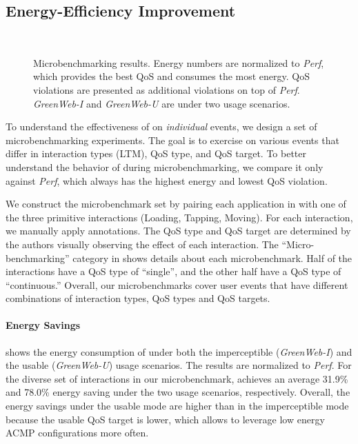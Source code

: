 \subsection{Energy-Efficiency Improvement}
\label{sec:lang:eval:effect}

\begin{figure}[p]
\centering
{}\\
\vspace*{25pt}
\caption{Microbenchmarking results. Energy numbers are normalized to \textit{Perf}, which provides the best QoS and consumes the most energy. QoS violations are presented as additional violations on top of \textit{Perf}. \textit{GreenWeb-I} and \textit{GreenWeb-U} are \greenweb under two usage scenarios.}
\label{fig:ubenchmark_results}
\end{figure}

To understand the effectiveness of \greenweb on \textit{individual} events, we design a set of microbenchmarking experiments. The goal is to exercise \greenweb on various events that differ in interaction types (LTM), QoS type, and QoS target. To better understand the behavior of \greenweb during microbenchmarking, we compare it only against \textit{Perf}, which always has the highest energy and lowest QoS violation.

We construct the microbenchmark set by pairing each application in  with one of the three primitive interactions (Loading, Tapping, Moving). For each interaction, we manually apply \greenweb annotations. The QoS type and QoS target are determined by the authors visually observing the effect of each interaction. The ``Micro-benchmarking'' category in  shows details about each microbenchmark. Half of the interactions have a QoS type of ``single'', and the other half have a QoS type of ``continuous.'' Overall, our microbenchmarks cover user events that have different combinations of interaction types, QoS types and QoS targets. 

\paragraph{Energy Savings}  shows the energy consumption of \greenweb under both the imperceptible (\textit{GreenWeb-I}) and the usable (\textit{GreenWeb-U}) usage scenarios. The results are normalized to \textit{Perf}. For the diverse set of interactions in our microbenchmark, \greenweb achieves an average 31.9\% and 78.0\% energy saving under the two usage scenarios, respectively. Overall, the energy savings under the usable mode are higher than in the imperceptible mode because the usable QoS target is lower, which allows \greenweb to leverage low energy ACMP configurations more often.

